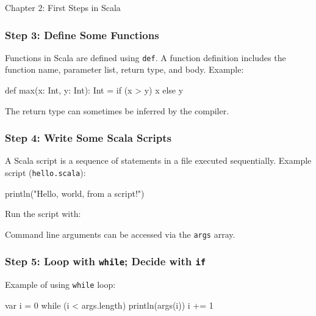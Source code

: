 \begin{notes}{Chapter 2: First Steps in Scala}
    \subsubsection*{Step 3: Define Some Functions}

    Functions in Scala are defined using \texttt{def}. A function definition includes the function name, parameter list, return type, and body. Example:

    \begin{highlight}
    \begin{code}[Scala]
    def max(x: Int, y: Int): Int = {
        if (x > y) x else y
    }
    \end{code}
    \end{highlight}

    The return type can sometimes be inferred by the compiler.

    \subsubsection*{Step 4: Write Some Scala Scripts}

    A Scala script is a sequence of statements in a file executed sequentially. Example script (\texttt{hello.scala}):

    \begin{highlight}
    \begin{code}[Scala]
    println("Hello, world, from a script!")
    \end{code}
    \end{highlight}

    Run the script with:

    \begin{highlight}
    \end{highlight}

    Command line arguments can be accessed via the \texttt{args} array.

    \subsubsection*{Step 5: Loop with \texttt{while}; Decide with \texttt{if}}

    Example of using \texttt{while} loop:

    \begin{highlight}
    \begin{code}[Scala]
    var i = 0
    while (i < args.length) {
        println(args(i))
        i += 1
    }
    \end{code}
    \end{highlight}


\end{notes}
